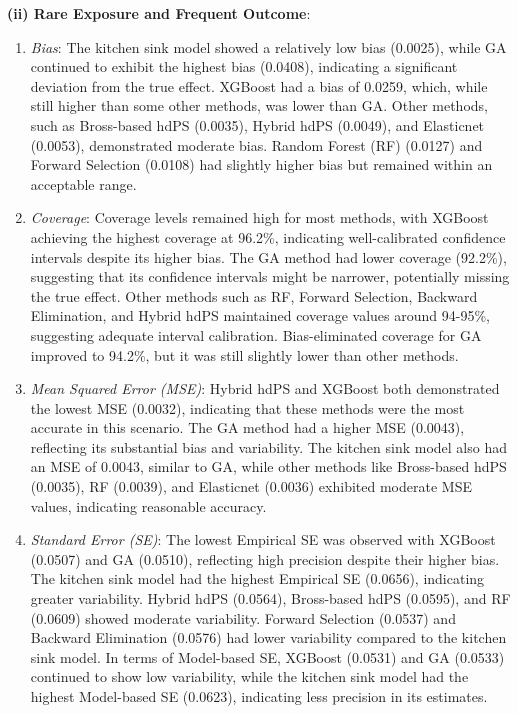\documentclass[sn-vancouver,Numbered,lineno,pdflatex]{sn-jnl}
\begin{document}
\textbf{(ii) Rare Exposure and Frequent Outcome}:

\begin{enumerate}
\def\labelenumi{\arabic{enumi}.}
\item
  \emph{Bias}: The kitchen sink model showed a relatively low bias
  (0.0025), while GA continued to exhibit the highest bias (0.0408),
  indicating a significant deviation from the true effect. XGBoost had a
  bias of 0.0259, which, while still higher than some other methods, was
  lower than GA. Other methods, such as Bross-based hdPS (0.0035),
  Hybrid hdPS (0.0049), and Elasticnet (0.0053), demonstrated moderate
  bias. Random Forest (RF) (0.0127) and Forward Selection (0.0108) had
  slightly higher bias but remained within an acceptable range.
\item
  \emph{Coverage}: Coverage levels remained high for most methods, with
  XGBoost achieving the highest coverage at 96.2\%, indicating
  well-calibrated confidence intervals despite its higher bias. The GA
  method had lower coverage (92.2\%), suggesting that its confidence
  intervals might be narrower, potentially missing the true effect.
  Other methods such as RF, Forward Selection, Backward Elimination, and
  Hybrid hdPS maintained coverage values around 94-95\%, suggesting
  adequate interval calibration. Bias-eliminated coverage for GA
  improved to 94.2\%, but it was still slightly lower than other
  methods.
\item
  \emph{Mean Squared Error (MSE)}: Hybrid hdPS and XGBoost both
  demonstrated the lowest MSE (0.0032), indicating that these methods
  were the most accurate in this scenario. The GA method had a higher
  MSE (0.0043), reflecting its substantial bias and variability. The
  kitchen sink model also had an MSE of 0.0043, similar to GA, while
  other methods like Bross-based hdPS (0.0035), RF (0.0039), and
  Elasticnet (0.0036) exhibited moderate MSE values, indicating
  reasonable accuracy.
\item
  \emph{Standard Error (SE)}: The lowest Empirical SE was observed with
  XGBoost (0.0507) and GA (0.0510), reflecting high precision despite
  their higher bias. The kitchen sink model had the highest Empirical SE
  (0.0656), indicating greater variability. Hybrid hdPS (0.0564),
  Bross-based hdPS (0.0595), and RF (0.0609) showed moderate
  variability. Forward Selection (0.0537) and Backward Elimination
  (0.0576) had lower variability compared to the kitchen sink model. In
  terms of Model-based SE, XGBoost (0.0531) and GA (0.0533) continued to
  show low variability, while the kitchen sink model had the highest
  Model-based SE (0.0623), indicating less precision in its estimates.
\end{enumerate}
\end{document}
